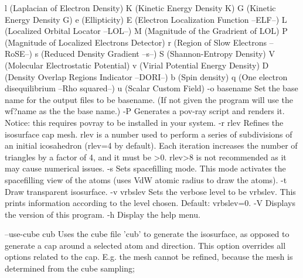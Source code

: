         		l (Laplacian of Electron Density)
         		K (Kinetic Energy Density K)
         		G (Kinetic Energy Density G)
         		e (Ellipticity)
         		E (Electron Localization Function --ELF--)
         		L (Localized Orbital Locator --LOL--)
         		M (Magnitude of the Gradrient of LOL)
         		P (Magnitude of Localized Electrons Detector)
         		r (Region of Slow Electrons --RoSE--)
         		s (Reduced Density Gradient --s--)
         		S (Shannon-Entropy Density)
         		V (Molecular Electrostatic Potential)
         		v (Virial Potential Energy Density)
         		D (Density Overlap Regions Indicator --DORI--)
         		b (Spin density)
         		q (One electron disequilibrium --Rho squared--)
         		u (Scalar Custom Field)
  -o basename	Set the base name for the output files to be basename.
            	  (If not given the program will use the wf?name as the
            	  the base name.)
  -P        	Generates a pov-ray script and renders it. Notice: this requires
            	   povray to be installed in your system.
  -r rlev   	Refines the isosurface cap mesh. rlev is a number used to
            	  perform a series of subdivisions of an initial icosahedron 
            	  (rlev=4 by default). Each iteration increases
            	  the number of triangles by a factor of 4, and it must be >0.
            	  rlev>8 is not recommended as it may cause numerical issues.
  -s        	Sets spacefilling mode. This mode activates the spacefilling
            	  view of the atoms (uses VdW atomic radius to draw the atoms).
  -t        	Draw transparent isosurface.
  -v vrbslev	Sets the verbose level to be vrbslev. This prints information according to
            	  the level chosen. Default: vrbslev=0.
  -V     	Displays the version of this program.
  -h     	Display the help menu.

  --use-cube cub 	Uses the cube file 'cub' to generate the isosurface,
                 	  as opposed to generate a cap around a selected atom
                 	  and direction. This option overrides all options
                 	  related to the cap. E.g. the mesh cannot be refined,
                 	  because the mesh is determined from the cube sampling;
                 	  
